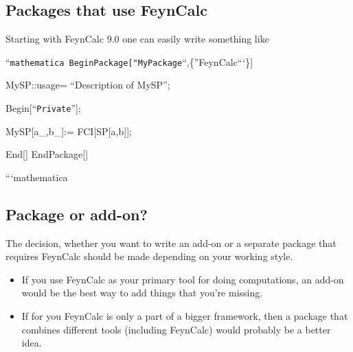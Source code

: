 \documentclass[../FeynCalcManual.tex]{subfiles}
\begin{document}
\hypertarget{packages-that-use-feyncalc}{%
\subsection{Packages that use
FeynCalc}\label{packages-that-use-feyncalc}}

Starting with FeynCalc 9.0 one can easily write something like

``\texttt{mathematica BeginPackage[\allowbreak{}"MyPackage}``,\{''FeynCalc```\}{]}

MySP::usage= ``Description of MySP'';

Begin{[}``\texttt{Private}''{]};

MySP{[}a\_,b\_{]}:= FCI{[}SP{[}a,b{]}{]};

End{[}{]} EndPackage{[}{]}

```mathematica

\hypertarget{package-or-add-on}{%
\subsection{Package or add-on?}\label{package-or-add-on}}

The decision, whether you want to write an add-on or a separate package
that requires FeynCalc should be made depending on your working style.

\begin{itemize}
\tightlist
\item
  If you use FeynCalc as your primary tool for doing computations, an
  add-on would be the best way to add things that you're missing.
\item
  If for you FeynCalc is only a part of a bigger framework, then a
  package that combines different tools (including FeynCalc) would
  probably be a better idea.
\end{itemize}
\end{document}
